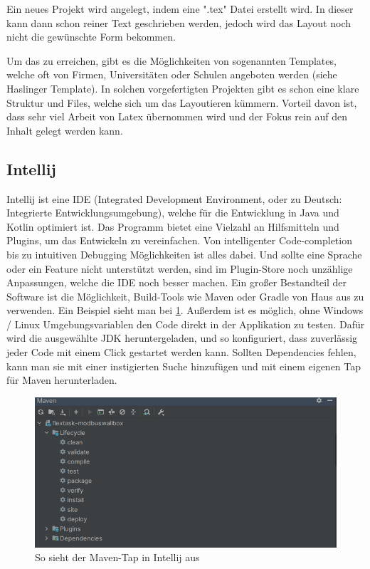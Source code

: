   

Ein neues Projekt wird angelegt, indem eine ".tex" Datei erstellt wird. In dieser kann dann schon reiner Text geschrieben werden, jedoch wird das Layout noch nicht die gewünschte Form bekommen.    

Um das zu erreichen, gibt es die Möglichkeiten von sogenannten Templates, welche oft von Firmen, Universitäten oder Schulen angeboten werden (siehe Haslinger Template). In solchen vorgefertigten Projekten gibt es schon eine klare Struktur und Files, welche sich um das Layoutieren kümmern. Vorteil davon ist, dass sehr viel Arbeit von Latex übernommen wird und der Fokus rein auf den Inhalt gelegt werden kann. 


\subsection{Intellij}

Intellij ist eine IDE (Integrated Development Environment, oder zu Deutsch: Integrierte Entwicklungsumgebung), welche für die Entwicklung in Java und Kotlin optimiert ist. Das Programm bietet eine Vielzahl an Hilfsmitteln und Plugins, um das Entwickeln zu vereinfachen. Von intelligenter Code-completion bis zu intuitiven Debugging Möglichkeiten ist alles dabei.  Und sollte eine Sprache oder ein Feature nicht unterstützt werden, sind im Plugin-Store noch unzählige Anpassungen, welche die IDE noch besser machen. Ein großer Bestandteil der Software ist die Möglichkeit, Build-Tools wie Maven oder Gradle von Haus aus zu verwenden. Ein Beispiel sieht man bei \ref{fig:impl:WallboxMavenTap}. Außerdem ist es möglich, ohne Windows / Linux Umgebungsvariablen den Code direkt in der Applikation zu testen. Dafür wird die ausgewählte JDK heruntergeladen, und so konfiguriert, dass zuverlässig jeder Code mit einem Click gestartet werden kann. Sollten Dependencies fehlen, kann man sie mit einer instigierten Suche hinzufügen und mit einem eigenen Tap für Maven herunterladen. 

\begin{figure}[h t]
    \centering
    \includegraphics[scale=0.5]{pics/MavenOverfiew.png}
    \caption{So sieht der Maven-Tap in Intellij aus}
    \label{fig:impl:WallboxMavenTap}
  \end{figure}

